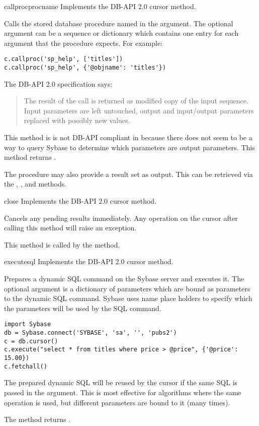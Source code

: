 \begin{methoddesc}[Cursor]{callproc}{procname }
Implements the DB-API 2.0 cursor  method.

Calls the stored database procedure named in the 
argument. The optional  argument can be a sequence or
dictionary which contains one entry for each argument that the
procedure expects.  For example:

\begin{verbatim}
c.callproc('sp_help', ['titles'])
c.callproc('sp_help', {'@objname': 'titles'})
\end{verbatim}

The DB-API 2.0 specification says:

\begin{quote}
The result of the call is returned as modified copy of the input
sequence.  Input parameters are left untouched, output and
input/output parameters replaced with possibly new values.
\end{quote}

This method is is not DB-API compliant in because there does not seem
to be a way to query Sybase to determine which parameters are output
parameters.  This method returns .

The procedure may also provide a result set as output. This can be
retrieved via the , , and
 methods.
\end{methoddesc}

\begin{methoddesc}[Cursor]{close}{}
Implements the DB-API 2.0 cursor  method.

Cancels any pending results immediately.  Any operation on the cursor
after calling this method will raise an exception.

This method is called by the  method.
\end{methoddesc}

\begin{methoddesc}[Cursor]{execute}{sql }
Implements the DB-API 2.0 cursor  method.

Prepares a dynamic SQL command on the Sybase server and executes it.
The optional  argument is a dictionary of parameters which
are bound as parameters to the dynamic SQL command.  Sybase uses name
place holders to specify which the parameters will be used by the SQL
command.

\begin{verbatim}
import Sybase
db = Sybase.connect('SYBASE', 'sa', '', 'pubs2')
c = db.cursor()
c.execute("select * from titles where price > @price", {'@price': 15.00})
c.fetchall()
\end{verbatim}

The prepared dynamic SQL will be reused by the cursor if the same SQL
is passed in the  argument.  This is most effective for
algorithms where the same operation is used, but different parameters
are bound to it (many times).

The method returns .
\end{methoddesc}

